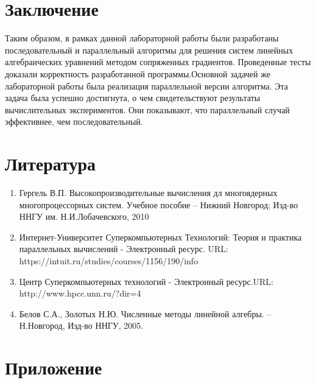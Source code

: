 \documentclass{report}
\begin{document}
\newpage

\section*{Заключение}
Таким образом, в рамках данной лабораторной работы были разработаны последовательный и параллельный алгоритмы для решения систем линейных алгебраических уравнений методом сопряженных градиентов. Проведенные тесты доказали корректность разработанной программы.Основной задачей же лабораторной работы была реализация параллельной версии алгоритма. Эта задача была успешно достигнута, о чем свидетельствуют результаты вычислительных экспериментов. Они показывают, что параллельный случай эффективнее, чем последовательный.
\newpage

\section*{Литература}
\begin{enumerate}
\item Гергель В.П. Высокопроизводительные вычисления дл многоядерных многопроцессорных систем. Учебное пособие – Нижний Новгород; Изд-во ННГУ им. Н.И.Лобачевского, 2010 
\item Интернет-Университет Суперкомпьютерных Технологий: Теория и практика параллельных вычислений - Электронный ресурс. \newline URL: https://intuit.ru/studies/courses/1156/190/info
\item Центр Суперкомпьютерных технологий - Электронный ресурс.\newline URL: http://www.hpcc.unn.ru/?dir=4
\item Белов С.А., Золотых Н.Ю. Численные методы линейной алгебры. –Н.Новгород, Изд-во ННГУ, 2005. 
\end{enumerate} 
\newpage

\section*{Приложение}
\end{document}
